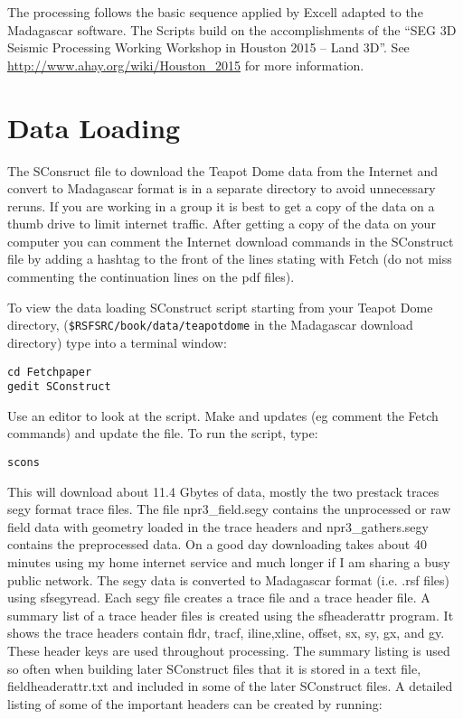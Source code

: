 The processing follows the basic sequence applied by Excell adapted to the Madagascar software.  The Scripts build on the accomplishments of the ``SEG 3D Seismic Processing Working Workshop in Houston 2015 – Land 3D''.  See \url{http://www.ahay.org/wiki/Houston_2015} for more information.

\section{Data Loading}
The SConsruct file to download the Teapot Dome data from the Internet and convert to Madagascar format is in a separate directory to avoid unnecessary reruns.  If you are working in a group it is best to get a copy of the data on a thumb drive to limit internet traffic.  After getting a copy of the data on your computer you can comment the Internet download commands in the SConstruct file by adding a hashtag to the front of the lines stating with Fetch (do not miss commenting the continuation lines on the pdf files).

To view the data loading SConstruct script starting from your Teapot Dome directory, (\texttt{\$RSFSRC/book/data/teapotdome} in the Madagascar download directory) type into a terminal window:

\begin{verbatim}
cd Fetchpaper
gedit SConstruct
\end{verbatim}  

Use an editor to look at the script.  Make and updates (eg comment the Fetch
commands) and update the file.  To run the script, type:

\begin{verbatim}
scons 
\end{verbatim}  

This will download about 11.4 Gbytes of data, mostly the two prestack traces segy format trace files.  The file npr3\_field.segy contains the unprocessed or raw field data with geometry loaded in the trace headers and npr3\_gathers.segy contains the preprocessed data.  On a good day downloading takes about 40 minutes using my home internet service and much longer if I am sharing a busy public network.   The segy data is converted to Madagascar format (i.e. .rsf files) using sfsegyread.  Each segy file creates a trace file and a trace header file.  A summary list of a trace header files is created using the sfheaderattr program.  It shows the trace headers contain fldr, tracf, iline,xline, offset, sx, sy, gx, and gy.  These header keys are used throughout processing.  The summary listing is used so often when building later SConstruct files that it is stored in a text file, fieldheaderattr.txt and included in some of the later SConstruct files.  A detailed listing of some of the important headers can be created by running:

